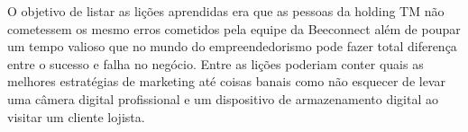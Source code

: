 O objetivo de listar as lições aprendidas era que as pessoas da holding TM não cometessem os mesmo erros cometidos pela equipe da Beeconnect além de poupar um tempo valioso que no mundo do empreendedorismo pode fazer total diferença entre o sucesso e falha no negócio. Entre as lições poderiam conter quais as melhores estratégias de marketing até coisas banais como não esquecer de levar uma câmera digital profissional e um dispositivo de armazenamento digital ao visitar um cliente lojista.